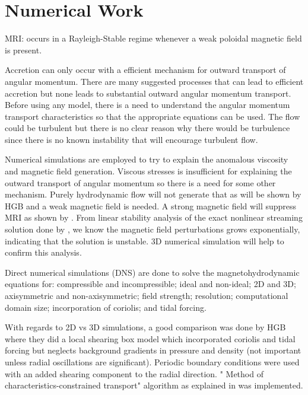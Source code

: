 \documentclass{jfm}
\begin{document}
\section{Numerical Work}

MRI: occurs in a Rayleigh-Stable regime whenever a weak poloidal magnetic 
field is present.

Accretion can only occur with a efficient mechanism for outward transport of 
angular momentum. There are many suggested processes that can lead to efficient
accretion but none leads to substantial outward angular momentum transport. 
Before using any model, there is a need to understand the angular momentum 
transport characteristics so that the appropriate equations can be used. The 
flow could be turbulent but there is no clear reason why there would be 
turbulence since there is no known instability that will encourage turbulent 
flow.

Numerical simulations are employed to try to explain the anomalous viscosity 
and magnetic field generation. Viscous stresses is insufficient for explaining 
the outward transport of angular momentum so there is a need for some other 
mechanism. Purely hydrodynamic flow will not generate that as will be shown by
HGB and a weak magnetic field is needed. A strong magnetic field will suppress
MRI as shown by \cite{Liu2008}. From linear stability analysis of the exact 
nonlinear streaming solution done by \cite{Goodman1994}, we know the magnetic
field perturbations grows exponentially, indicating that the solution is 
unstable. 3D numerical simulation will help to confirm this analysis.

Direct numerical simulations (DNS) are done to solve the magnetohydrodynamic 
equations for: compressible and incompressible; ideal and non-ideal; 2D and 3D;
axisymmetric and non-axisymmetric; field strength; resolution; computational 
domain size; incorporation of coriolis; and tidal forcing.

With regards to 2D vs 3D simulations, a good comparison was done by 
\cite{Hawley1995} HGB where they did a local shearing box model which 
incorporated coriolis and tidal forcing but neglects background gradients in 
pressure and density (not important unless radial oscillations are 
significant). Periodic boundary conditions were used with an added shearing 
component to the radial direction. " Method of characteristics-constrained 
transport" algorithm as explained in \cite{Hawley1995} was implemented.
\end{document}
